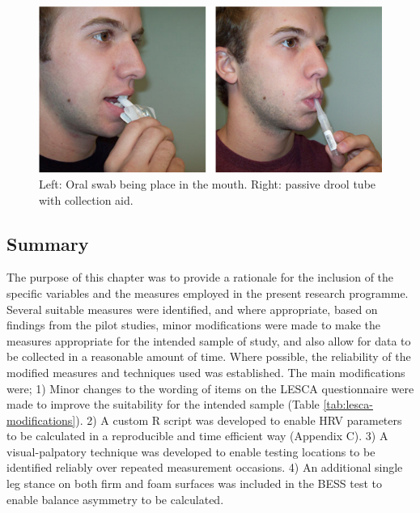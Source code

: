 \documentclass[
  english,
  man,floatsintext]{apa6}
\begin{document}
\begin{figure}[H]

{\centering \includegraphics[width=5.96in]{figs/measures/salivatechniques} 

}

\caption{Left: Oral swab being place in the mouth. Right: passive drool tube with collection aid.}\label{fig:saliva-techniques}
\end{figure}

\hypertarget{summary-1}{%
\subsection{Summary}\label{summary-1}}

The purpose of this chapter was to provide a rationale for the inclusion of the specific variables and the measures employed in the present research programme.
Several suitable measures were identified, and where appropriate, based on findings from the pilot studies, minor modifications were made to make the measures appropriate for the intended sample of study, and also allow for data to be collected in a reasonable amount of time.
Where possible, the reliability of the modified measures and techniques used was established.
The main modifications were;
1) Minor changes to the wording of items on the LESCA questionnaire were made to improve the suitability for the intended sample (Table \ref{tab:lesca-modifications}).
2) A custom R script was developed to enable HRV parameters to be calculated in a reproducible and time efficient way (Appendix C).
3) A visual-palpatory technique was developed to enable testing locations to be identified reliably over repeated measurement occasions.
4) An additional single leg stance on both firm and foam surfaces was included in the BESS test to enable balance asymmetry to be calculated.

\clearpage
\end{document}
